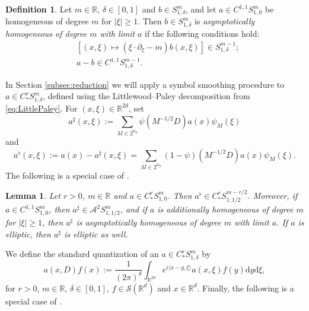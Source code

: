 \documentclass{amsart}
\numberwithin{equation}{section}
\newtheorem{lemma}[theorem]{Lemma}
\theoremstyle{definition}
\newtheorem{definition}[theorem]{Definition}
\newcommand{\R}{\mathbb{R}}
\newcommand{\Rd}{\mathbb{R}^{d}}
\newcommand{\N}{\mathbb{N}}
\newcommand {\A}{\mathcal{A}}
\newcommand {\ud}{\mathrm{d}}
\newcommand {\Sw}{\mathcal{S}}
\begin{document}
\begin{definition}\label{def:asymphom}
Let  
$m\in\R$, $\delta\in[0,1]$ and $b\in S^{m}_{1,\delta}$, and let $a\in C^{1,1} S^{m}_{1,0}$ be homogeneous of degree $m$ for $|\xi|\geq1$. Then $b\in S^{m}_{1,\delta}$ is \emph{asymptotically homogeneous of degree $m$ with limit} $a$ if the following conditions hold:
\begin{subequations}\label{eq:asymphom}
\begin{align*}
& [(x,\xi)\mapsto (\xi\cdot \partial_{\xi}-m)b(x,\xi)]\in S^{m-1}_{1,\delta};\\%
& a-b\in C^{1,1} S^{m-1}_{1,\delta}.%
\end{align*}
\end{subequations}
\end{definition}



In Section \ref{subsec:reduction} we will apply a symbol smoothing procedure to $a\in C^{r}_{*}S^{m}_{1,\delta}$, defined using the Littlewood--Paley decomposition from \eqref{eq:LittlePaley}. For $(x,\xi)\in\R^{2d}$, set
\[
a^{\sharp}(x,\xi):=\sum_{M\in 2^{\N_{0}}}\psi(M^{-1/2}D)a(x)\psi_{M}(\xi)
\]
and
\begin{equation}\label{eq:flat}
a^{\flat}(x,\xi):=a(x)-a^{\sharp}(x,\xi)=\sum_{M\in 2^{\N_{0}}}(1-\psi)(M^{-1/2}D)a(x)\psi_{M}(\xi).
\end{equation}
The following is a special case of \cite[Lemma 3.8]{LiRoSo25a}. 

\begin{lemma}\label{lem:smoothing}
Let $r>0$, $m\in\R$ and $a\in C^{r}_{*}S^{m}_{1,0}$. Then $a^{\flat}\in C^{r}_{*}S^{m-r/2}_{1,1/2}$. Moreover, if $a\in C^{1,1}S^{m}_{1,0}$, then $a^{\sharp}\in \A^{2}S^{m}_{1,1/2}$, and if $a$ is additionally homogeneous of degree $m$ for $|\xi|\geq 1$, %
then $a^{\sharp}$ is asymptotically homogeneous of degree $m$ with limit $a$. If $a$ is elliptic, then $a^{\sharp}$ is elliptic as well.
\end{lemma}

We define the standard quantization of an $a\in C^{r}_{*}S^{m}_{1,\delta}$ by
\begin{equation*}
    a(x,D) f(x) := \frac{1}{(2\pi)^d} \int_{\R^{2d}} e^{i \langle x-y,\xi \rangle} a(x,\xi) f(y) \ud y\ud \xi,
\end{equation*}
for $r>0$, $m\in\R$, $\delta\in[0,1]$, $f\in\Sw(\Rd)$ and $x\in\Rd$. 
Finally, the following is a special case of \cite[Theorem 3.19]{LiRoSo25a}. 
\end{document}
